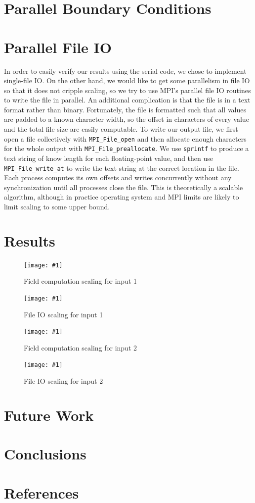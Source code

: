 \documentclass[twocolumn]{article}
\newcommand{\myimage}[3]{
\begin{figure}[!ht]
\caption{#2}
\label{#3}
\texttt{[image: \#1]}
\end{figure}
}
\begin{document}
\section{Parallel Boundary Conditions}
\section{Parallel File IO}

In order to easily verify our results using the serial code,
we chose to implement single-file IO.
On the other hand, we would like to get some parallelism in
file IO so that it does not cripple scaling, so we try to use
MPI's parallel file IO routines to write the file in parallel.
An additional complication is that the file is in a text format
rather than binary.
Fortunately, the file is formatted such that all values are
padded to a known character width, so the offset in characters
of every value and the total file size are easily computable.
To write our output file, we first open a file collectively
with \texttt{MPI\_File\_open} and then 
allocate enough characters for the whole output with
\texttt{MPI\_File\_preallocate}.
We use
\texttt{sprintf} to produce a text string of know length for
each floating-point value, and then use
\texttt{MPI\_File\_write\_at} to write the text string at
the correct location in the file.
Each process computes its own offsets and writes concurrently
without any synchronization until all processes close the file.
This is theoretically a scalable algorithm, although in practice
operating system and MPI limits are likely to limit scaling
to some upper bound.

\section{Results}

\myimage{one_calc.png}{Field computation scaling for input 1}{fig:calc1}
\myimage{one_file.png}{File IO scaling for input 1}{fig:file1}
\myimage{two_calc.png}{Field computation scaling for input 2}{fig:calc2}
\myimage{two_file.png}{File IO scaling for input 2}{fig:file2}

\section{Future Work}

\section{Conclusions}

\section{References}
\end{document}
